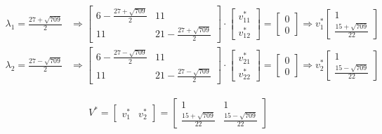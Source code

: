 \documentclass[a4paper, spanish]{article}
\begin{document}
  \begin{align}
    \lambda_1 = \frac{27 + \sqrt{709}}{2} &\Rightarrow
    \begin{bmatrix}
      6 - \frac{27 + \sqrt{709}}{2} & 11\\
      11 & 21 - \frac{27 + \sqrt{709}}{2}
    \end{bmatrix}
    \cdot
    \begin{bmatrix}
      v_{11}^* \\
      v_{12}^*
    \end{bmatrix}
    =
    \begin{bmatrix}
      0 \\
      0
    \end{bmatrix}
    \Rightarrow
    v_1^*
    \begin{bmatrix}
      1 \\
      \frac{15 + \sqrt{709}}{22}
    \end{bmatrix} \\
    \lambda_2 = \frac{27 - \sqrt{709}}{2} &\Rightarrow
    \begin{bmatrix}
      6 - \frac{27 - \sqrt{709}}{2} & 11\\
      11 & 21 - \frac{27 - \sqrt{709}}{2}
    \end{bmatrix}
    \cdot
    \begin{bmatrix}
      v_{21}^* \\
      v_{22}^*
    \end{bmatrix}
    =
    \begin{bmatrix}
      0 \\
      0
    \end{bmatrix}
    \Rightarrow
    v_2^*
    \begin{bmatrix}
      1 \\
      \frac{15 - \sqrt{709}}{22}
    \end{bmatrix}
  \end{align}


  \begin{align}
    V^* =
    \begin{bmatrix}
      v_1^* & v_2^*
    \end{bmatrix} =
    \begin{bmatrix}
      1 & 1 \\
      \frac{15 + \sqrt{709}}{22}  & \frac{15 - \sqrt{709}}{22}
    \end{bmatrix}
  \end{align}
\end{document}
